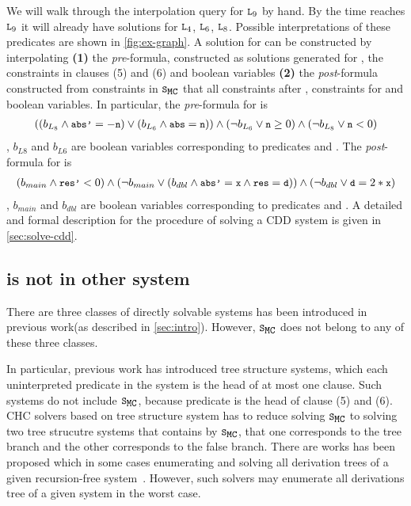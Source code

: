 We will walk through the interpolation query for $\cc{L}_9$ by hand.
By the time \sys reaches $\cc{L}_9$ it will already have solutions for
$\cc{L}_4$, $\cc{L}_6$, $\cc{L}_8$. Possible interpretations of these
predicates are shown in \autoref{fig:ex-graph}.
%
A solution for  can be constructed by interpolating \textbf{(1)}
the \emph{pre}-formula, constructed as solutions generated for , 
the constraints in clauses (5) and (6) and boolean variables%
\textbf{(2)} the \emph{post}-formula constructed from constraints in
$\mcchc$ that all constraints after , constraints for 
and boolean variables.
%
In particular, the \emph{pre}-formula for  is 
\begin{gather}
  ((b_{L_8}\land \cc{abs'}= -\cc{n})
    \lor (b_{L_6} \land \cc{abs}=\cc{n}))
  \land (\neg b_{L_6} \lor \cc{n} \ge 0)
    \land (\neg b_{L_8} \lor \cc{n}<0)
\end{gather}
%
, $b_{L8}$ and $b_{L6}$ are boolean variables corresponding to predicates  and .
%
The \emph{post}-formula for  is
\begin{gather}
  (b_{main} \land \cc{res'} < 0 )
    \land (\neg b_{main} \lor (b_{dbl} \land \cc{abs'}= \cc{x} \land \cc{res}=\cc{d} ))
  \land (\neg b_{dbl} \lor \cc{d} = 2*\cc{x})
\end{gather}
, $b_{main}$ and $b_{dbl}$ are boolean variables corresponding to
predicates  and .
%
A detailed and formal description for the procedure of solving a CDD system is given in
\autoref{sec:solve-cdd}.


\subsection{ is not in other system}
\label{sec:not-in}
%
There are three classes of directly solvable systems has been introduced
in previous work(as described in \autoref{sec:intro}).
%
However, $\mcchc$ does not belong to any of these three classes.
%

In particular, previous work has introduced tree structure systems\cite{bjorner13,heizmann10},
which each uninterpreted predicate in the system is the head of at most one clause.
%
Such systems do not include $\mcchc$, because predicate  is the head 
of clause (5) and (6).
%
CHC solvers based on tree structure system has to reduce solving $\mcchc$ to
solving two tree strucutre systems that contains by $\mcchc$, that one corresponds
to the tree branch and the other corresponds to the false branch.
There are works has been proposed which in some cases enumerating 
and solving all derivation trees 
of a given recursion-free
system~\cite{mcmillan14}.
%
However, such solvers may enumerate all derivations tree of a given system
in the worst case.

